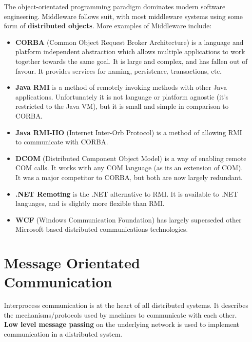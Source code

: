 \documentclass{article}
\begin{document}
The object-orientated programming paradigm dominates modern software engineering. Middleware follows suit, with most middleware systems using some form of \textbf{distributed objects}. More examples of Middleware include:
\begin{itemize}
    \item \textbf{CORBA} (Common Object Request Broker Architecture) is a language and platform independent abstraction which allows multiple applications to work together towards the same goal. It is large and complex, and has fallen out of favour. It provides services for naming, persistence, transactions, etc.
    \item \textbf{Java RMI} is a method of remotely invoking methods with other Java applications. Unfortunately it is not language or platform agnostic (it's restricted to the Java VM), but it is small and simple in comparison to CORBA.
    \item \textbf{Java RMI-IIO} (Internet Inter-Orb Protocol) is a method of allowing RMI to communicate with CORBA.
    \item \textbf{DCOM} (Distributed Component Object Model) is a way of enabling remote COM calls. It works with any COM language (as its an extension of COM). It was a major competitor to CORBA, but both are now largely redundant.
    \item \textbf{.NET Remoting} is the .NET alternative to RMI. It is available to .NET languages, and is slightly more flexible than RMI.
    \item \textbf{WCF} (Windows Communication Foundation) has largely superseded other Microsoft based distributed communications technologies.
\end{itemize}

\section{Message Orientated Communication}

Interprocess communication is at the heart of all distributed systems. It describes the mechanisms/protocols used by machines to communicate with each other. \textbf{Low level message passing} on the underlying network is used to implement communication in a distributed system.
\end{document}
